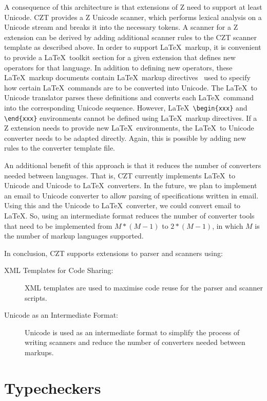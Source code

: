 \documentclass{llncs}
\begin{document}
A consequence of this architecture is that extensions of Z need
to support at least Unicode.  CZT provides a Z Unicode scanner, which
performs lexical analysis on a Unicode stream and breaks it into the
necessary tokens.  A scanner for a Z extension can be derived by
adding additional scanner rules to the CZT scanner template as
described above.  In order to support \LaTeX\ markup, it is convenient
to provide a \LaTeX\ toolkit section for a given extension that
defines new operators for that language.  In
addition to defining new operators, these \LaTeX\ markup documents
contain \LaTeX\ markup directives~\cite{isoz,czt} used to specify how
certain \LaTeX\ commands are to be converted into Unicode.  The
\LaTeX\ to Unicode translator parses these definitions and converts
each \LaTeX\ command into the corresponding Unicode sequence.
However, \LaTeX\ \verb+\begin{xxx}+ and \verb+\end{xxx}+ environments
cannot be defined using \LaTeX\ markup directives.  If a Z extension
needs to provide new \LaTeX\ environments, the \LaTeX\ to Unicode converter
needs to be adapted directly.  Again, this is possible by adding new
rules to the converter template file.

An additional benefit of this approach is that it reduces the number
of converters needed between languages. That is, CZT currently
implements \LaTeX\ to Unicode and Unicode to \LaTeX\ converters. In
the future, we plan to implement an email to Unicode converter to
allow parsing of specifications written in email. Using this and the
Unicode to \LaTeX\ converter, we could convert email to \LaTeX. So,
using an intermediate format reduces the number of converter tools
that need to be implemented from $M*(M-1)$ to $2*(M-1)$, in which $M$
is the number of markup languages supported.

In conclusion, CZT supports extensions to parser and scanners using:
\begin{description}
  \item[XML Templates for Code Sharing:] XML templates are used
  to maximise code reuse for the parser and scanner scripts.
  \item[Unicode as an Intermediate Format:] Unicode is used as an
    intermediate format to simplify the process of writing scanners
    and reduce the number of converters needed between markups.
\end{description}


\section{Typecheckers}
\label{typecheckers}
\end{document}
